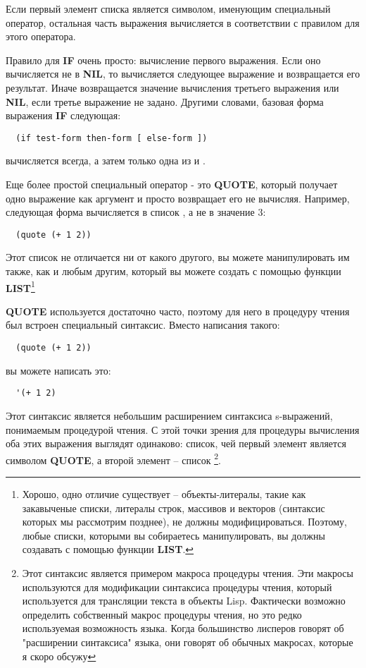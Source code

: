 Если первый элемент списка является символом, именующим специальный оператор, остальная
часть выражения вычисляется в соответствии с правилом для этого оператора.

Правило для \textbf{IF} очень просто: вычисление первого выражения. Если оно вычисляется
не в \textbf{NIL}, то вычисляется следующее выражение и возвращается его результат. Иначе
возвращается значение вычисления третьего выражения или \textbf{NIL}, если третье
выражение не задано. Другими словами, базовая форма выражения \textbf{IF} следующая:

\begin{lstlisting}
  (if test-form then-form [ else-form ])
\end{lstlisting}

 вычисляется всегда, а затем только одна из  и
.

Еще более простой специальный оператор - это \textbf{QUOTE}, который получает одно
выражение как аргумент и просто возвращает его не вычисляя. Например, следующая форма
вычисляется в список , а не в значение 3:

\begin{lstlisting}
  (quote (+ 1 2))
\end{lstlisting}

Этот список не отличается ни от какого другого, вы можете манипулировать им также, как и
любым другим, который вы можете создать с помощью функции \textbf{LIST}\footnote{Хорошо,
  одно отличие существует -- объекты-литералы, такие как закавыченые списки, литералы
  строк, массивов и векторов (синтаксис которых мы рассмотрим позднее), не должны
  модифицироваться. Поэтому, любые списки, которыми вы собираетесь манипулировать, вы
  должны создавать с помощью функции \textbf{LIST}.}

\textbf{QUOTE} используется достаточно часто, поэтому для него в процедуру чтения был
встроен специальный синтаксис. Вместо написания такого:

\begin{lstlisting}
  (quote (+ 1 2))
\end{lstlisting}

вы можете написать это:

\begin{lstlisting}
  '(+ 1 2)
\end{lstlisting}

Этот синтаксис является небольшим расширением синтаксиса s-выражений, понимаемым
процедурой чтения. С этой точки зрения для процедуры вычисления оба этих выражения
выглядят одинаково: список, чей первый элемент является символом \textbf{QUOTE}, а второй
элемент -- список \footnote{Этот синтаксис является примером макроса
  процедуры чтения. Эти макросы используются для модификации синтаксиса процедуры чтения,
  который используется для трансляции текста в объекты Lisp. Фактически возможно
  определить собственный макрос процедуры чтения, но это редко используемая возможность
  языка. Когда большинство лисперов говорят об "расширении синтаксиса" языка, они говорят
  об обычных макросах, которые я скоро обсужу}.

